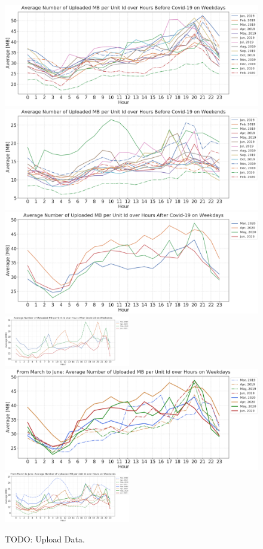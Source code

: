 \documentclass[conference,10pt]{IEEEtran}
\begin{document}
\begin{figure}[t]
  \centering
  \includegraphics[width=.49\textwidth]{figs/wenjun/upload_wdays_before.png}
  \includegraphics[width=.49\textwidth]{figs/wenjun/upload_wends_before.png}
  \includegraphics[width=.49\textwidth]{figs/wenjun/upload_wdays_after.png}
  \includegraphics[width=0.49\textwidth]{figs/wenjun/upload_wends_after.png}
  \includegraphics[width=.49\textwidth]{figs/wenjun/upload_wdays_compare_36.png}
  \includegraphics[width=0.49\textwidth]{figs/wenjun/upload_wends_compare_36.png}

  \vspace*{-1em}
  \caption{TODO: Upload Data.}
    \vspace*{-1em}
  \label{fig:upload_data_per_user_hours_fig}
\end{figure}
\end{document}

